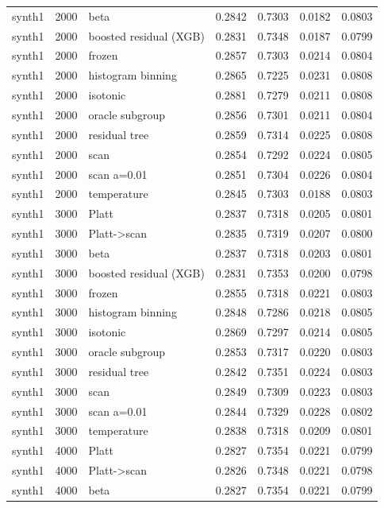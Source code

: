 \begin{tabular}{lllrrrr}
synth1 & 2000 & beta & 0.2842 & 0.7303 & 0.0182 & 0.0803 \\
synth1 & 2000 & boosted residual (XGB) & 0.2831 & 0.7348 & 0.0187 & 0.0799 \\
synth1 & 2000 & frozen & 0.2857 & 0.7303 & 0.0214 & 0.0804 \\
synth1 & 2000 & histogram binning & 0.2865 & 0.7225 & 0.0231 & 0.0808 \\
synth1 & 2000 & isotonic & 0.2881 & 0.7279 & 0.0211 & 0.0808 \\
synth1 & 2000 & oracle subgroup & 0.2856 & 0.7301 & 0.0211 & 0.0804 \\
synth1 & 2000 & residual tree & 0.2859 & 0.7314 & 0.0225 & 0.0808 \\
synth1 & 2000 & scan & 0.2854 & 0.7292 & 0.0224 & 0.0805 \\
synth1 & 2000 & scan a=0.01 & 0.2851 & 0.7304 & 0.0226 & 0.0804 \\
synth1 & 2000 & temperature & 0.2845 & 0.7303 & 0.0188 & 0.0803 \\
synth1 & 3000 & Platt & 0.2837 & 0.7318 & 0.0205 & 0.0801 \\
synth1 & 3000 & Platt->scan & 0.2835 & 0.7319 & 0.0207 & 0.0800 \\
synth1 & 3000 & beta & 0.2837 & 0.7318 & 0.0203 & 0.0801 \\
synth1 & 3000 & boosted residual (XGB) & 0.2831 & 0.7353 & 0.0200 & 0.0798 \\
synth1 & 3000 & frozen & 0.2855 & 0.7318 & 0.0221 & 0.0803 \\
synth1 & 3000 & histogram binning & 0.2848 & 0.7286 & 0.0218 & 0.0805 \\
synth1 & 3000 & isotonic & 0.2869 & 0.7297 & 0.0214 & 0.0805 \\
synth1 & 3000 & oracle subgroup & 0.2853 & 0.7317 & 0.0220 & 0.0803 \\
synth1 & 3000 & residual tree & 0.2842 & 0.7351 & 0.0224 & 0.0803 \\
synth1 & 3000 & scan & 0.2849 & 0.7309 & 0.0223 & 0.0803 \\
synth1 & 3000 & scan a=0.01 & 0.2844 & 0.7329 & 0.0228 & 0.0802 \\
synth1 & 3000 & temperature & 0.2838 & 0.7318 & 0.0209 & 0.0801 \\
synth1 & 4000 & Platt & 0.2827 & 0.7354 & 0.0221 & 0.0799 \\
synth1 & 4000 & Platt->scan & 0.2826 & 0.7348 & 0.0221 & 0.0798 \\
synth1 & 4000 & beta & 0.2827 & 0.7354 & 0.0221 & 0.0799 \\

\end{tabular}
